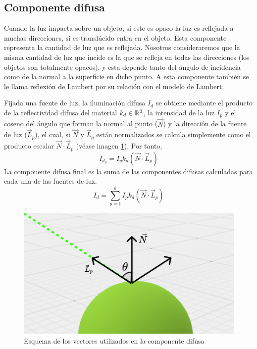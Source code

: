 \subsection{Componente difusa}

Cuando la luz impacta sobre un objeto, si este es opaco la luz es reflejada a muchas direcciones, si es translúcido entra en el objeto. Esta componente representa la cantidad de luz que es reflejada. Nosotros consideraremos que la misma cantidad de luz que incide es la que se refleja en todas las direcciones (los objetos son totalmente opacos), y esta depende tanto del ángulo de incidencia como de la normal a la superficie en dicho punto. A esta componente también se le llama reflexión de Lambert por su relación con el modelo de Lambert.

Fijada una fuente de luz, la iluminación difusa $I_d$ se obtiene mediante el producto de la reflectividad difusa del material $k_d\in\mathbb{R}^3$, la intensidad de la luz $I_p$ y el coseno del ángulo que forman la normal al punto ($\vec N$) y la dirección de la fuente de luz ($\vec L_p$), el cual, si $\vec N$ y $\vec L_p$ están normalizados se calcula simplemente como el producto escalar $\vec N\cdot \vec L_p$ (véase imagen \ref{fig:difusa}). Por tanto,
\begin{equation}
    I_{d_p} = I_p k_d (\vec N\cdot \vec L_p)
\end{equation}
La componente difusa final es la suma de las componentes difusas calculadas para cada una de las fuentes de luz.
\begin{equation}
    I_d = \sum_{p=1}^k I_p k_d (\vec N\cdot \vec L_p)
\end{equation}

\begin{figure} [ht]
    \centering
    \includegraphics[scale = 0.25]{img/C7/difusa.png}
    \caption{Esquema de los vectores utilizados en la componente difusa}
    \label{fig:difusa}
\end{figure}

